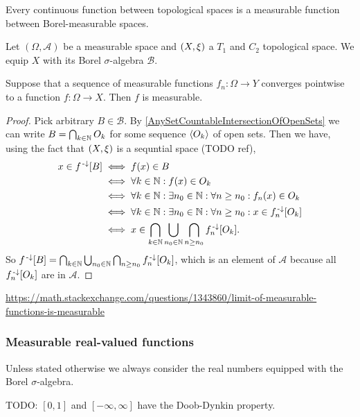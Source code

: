 \begin{lemma}
Every continuous function between topological spaces is a measurable function between Borel-measurable spaces.
\end{lemma}

\begin{proposition} \label{pointWiseConvergenceMeasurable}
Let $(\Omega,\mathcal{A})$ be a measurable space and $\sSet{X,\xi}$ a $T_1$ and $C_2$ topological space. We equip $X$ with its Borel $\sigma$-algebra $\mathcal{B}$.

Suppose that a sequence of measurable functions $f_n : \Omega \to Y$ converges pointwise to a function $f:\Omega\to X$. Then $f$ is measurable.
\end{proposition}
\begin{proof}
Pick arbitrary $B\in \mathcal{B}$. By \ref{AnySetCountableIntersectionOfOpenSets} we can write $B = \bigcap_{k\in\mathbb{N}}O_k$ for some sequence $\left\langle O_k \right\rangle$ of open sets. Then we have, using the fact that $\sSet{X,\xi}$ is a sequntial space (TODO ref),
\begin{align*}
x\in f^{{\text{\hspace{0.15em}-}\downarrow}}[B] &\iff f(x)\in B \\
&\iff \forall k\in\mathbb{N}: f(x)\in O_k\\
&\iff \forall k\in\mathbb{N}: \exists n_0\in\mathbb{N}: \forall n\geq n_0: f_n(x)\in O_k \\
&\iff \forall k\in\mathbb{N}: \exists n_0\in\mathbb{N}: \forall n\geq n_0: x\in f^{{\text{\hspace{0.15em}-}\downarrow}}_n[O_k] \\
&\iff x\in \bigcap_{k\in\mathbb{N}}\bigcup_{n_0\in\mathbb{N}}\bigcap_{n\geq n_0}f^{{\text{\hspace{0.15em}-}\downarrow}}_n[O_k].
\end{align*}
So $f^{{\text{\hspace{0.15em}-}\downarrow}}[B] = \bigcap_{k\in\mathbb{N}}\bigcup_{n_0\in\mathbb{N}}\bigcap_{n\geq n_0}f^{{\text{\hspace{0.15em}-}\downarrow}}_n[O_k]$, which is an element of $\mathcal{A}$ because all $f^{{\text{\hspace{0.15em}-}\downarrow}}_n[O_k]$ are in $\mathcal{A}$.
\end{proof}

\url{https://math.stackexchange.com/questions/1343860/limit-of-measurable-functions-is-measurable}


\subsubsection{Measurable real-valued functions}
Unless stated otherwise we always consider the real numbers equipped with the Borel $\sigma$-algebra.

\begin{proposition}
TODO: $[0,1]$ and $[-\infty,\infty]$ have the Doob-Dynkin property.
\end{proposition}


